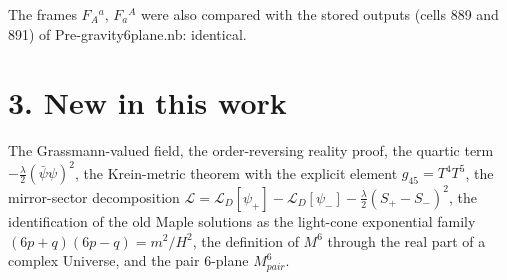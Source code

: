 \documentclass[10pt]{article}
\begin{document}
The frames $F_A{}^a$, $F_a{}^A$ were also compared with the stored outputs (cells 889 and 891) of Pre-gravity6plane.nb: identical.


\section*{3. New in this work}

The Grassmann-valued field, the order-reversing reality proof, the quartic term $-\frac\lambda2(\bar\psi\psi)^2$, the Krein-metric theorem with the explicit element $g_{45}=T^4T^5$, the mirror-sector decomposition $\mathcal L = \mathcal L_D[\psi_+] - \mathcal L_D[\psi_-] - \frac\lambda2(S_+-S_-)^2$, the identification of the old Maple solutions as the light-cone exponential family $(6p+q)(6p-q) = m^2/H^2$, the definition of $M^6$ through the real part of a complex Universe, and the pair 6-plane $M^6_{pair}$.
\end{document}
